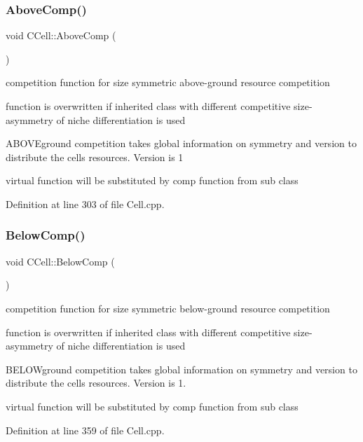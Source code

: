 \subsubsection{\texorpdfstring{AboveComp()}{AboveComp()}}
{\footnotesize\ttfamily void C\+Cell\+::\+Above\+Comp (\begin{DoxyParamCaption}{ }\end{DoxyParamCaption})\hspace{0.3cm}{\ttfamily [virtual]}}



competition function for size symmetric above-\/ground resource competition 

function is overwritten if inherited class with different competitive size-\/asymmetry of niche differentiation is used

A\+B\+O\+V\+Eground competition takes global information on symmetry and version to distribute the cell\textquotesingle{}s resources. Version is 1

virtual function will be substituted by comp function from sub class 

Definition at line 303 of file Cell.\+cpp.

\mbox{\label{class_c_cell_aab26e9d4c0150cee0bbc7f836f0d6b34}} 
\subsubsection{\texorpdfstring{BelowComp()}{BelowComp()}}
{\footnotesize\ttfamily void C\+Cell\+::\+Below\+Comp (\begin{DoxyParamCaption}{ }\end{DoxyParamCaption})\hspace{0.3cm}{\ttfamily [virtual]}}



competition function for size symmetric below-\/ground resource competition 

function is overwritten if inherited class with different competitive size-\/asymmetry of niche differentiation is used

B\+E\+L\+O\+Wground competition takes global information on symmetry and version to distribute the cell\textquotesingle{}s resources. Version is 1.

virtual function will be substituted by comp function from sub class 

Definition at line 359 of file Cell.\+cpp.

